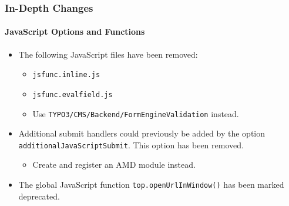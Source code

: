 \begin{frame}[fragile]
	\frametitle{In-Depth Changes}
	\framesubtitle{JavaScript Options and Functions}

	\begin{itemize}
		\item The following JavaScript files have been removed:

			\begin{itemize}
				\item \texttt{jsfunc.inline.js}
				\item \texttt{jsfunc.evalfield.js}
			\end{itemize}

			\begin{itemize}\smaller
				\item[\ding{228}] Use \texttt{TYPO3/CMS/Backend/FormEngineValidation} instead.
			\end{itemize}\normalsize

		\item Additional submit handlers could previously be added by the option \texttt{additionalJavaScriptSubmit}.
			This option has been removed.

			\begin{itemize}\smaller
				\item[\ding{228}] Create and register an AMD module instead.
			\end{itemize}\normalsize

		\item The global JavaScript function \texttt{top.openUrlInWindow()} has been marked deprecated.

	\end{itemize}

\end{frame}


